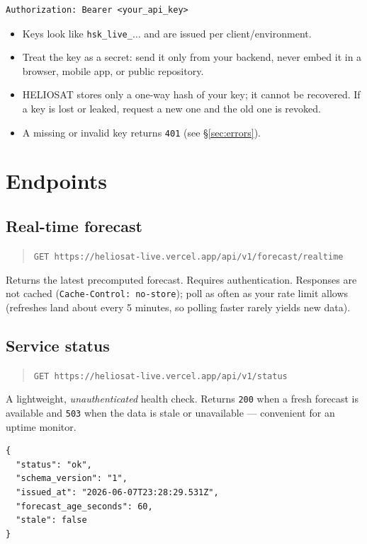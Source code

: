 \documentclass[11pt,a4paper]{article}
\newcommand{\tc}[1]{\texttt{#1}}
\newcommand{\baseurl}{https://heliosat-live.vercel.app}
\begin{document}
\begin{lstlisting}[style=bash]
Authorization: Bearer <your_api_key>
\end{lstlisting}

\begin{itemize}[leftmargin=1.4em]
  \item Keys look like \tc{hsk\_live\_$\ldots$} and are issued per client/environment.
  \item Treat the key as a secret: send it only from your backend, never embed it in a
        browser, mobile app, or public repository.
  \item HELIOSAT stores only a one-way hash of your key; it cannot be recovered. If a
        key is lost or leaked, request a new one and the old one is revoked.
  \item A missing or invalid key returns \tc{401} (see \S\ref{sec:errors}).
\end{itemize}

\section{Endpoints}

\subsection{Real-time forecast}
\begin{quote}\tc{GET \baseurl/api/v1/forecast/realtime}\end{quote}
Returns the latest precomputed forecast. Requires authentication. Responses are not
cached (\tc{Cache-Control: no-store}); poll as often as your rate limit allows
(refreshes land about every 5 minutes, so polling faster rarely yields new data).

\subsection{Service status}
\begin{quote}\tc{GET \baseurl/api/v1/status}\end{quote}
A lightweight, \emph{unauthenticated} health check. Returns \tc{200} when a fresh
forecast is available and \tc{503} when the data is stale or unavailable --- convenient
for an uptime monitor.

\begin{lstlisting}[style=json]
{
  "status": "ok",
  "schema_version": "1",
  "issued_at": "2026-06-07T23:28:29.531Z",
  "forecast_age_seconds": 60,
  "stale": false
}
\end{lstlisting}
\end{document}
